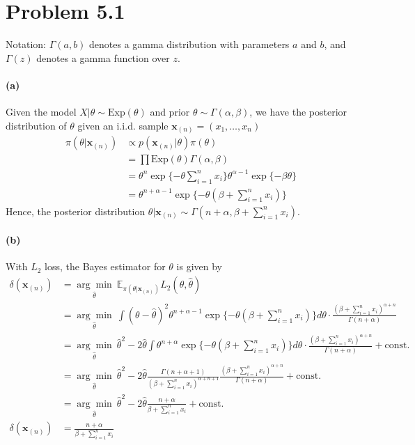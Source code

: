 \section{Problem 5.1}
Notation: $\Gamma(a, b)$ denotes a gamma distribution with parameters $a$ and $b$, and $\Gamma(z)$ denotes a gamma function over $z$.

\paragraph{(a)}
Given the model $X \vert \theta \sim \mathrm{Exp}(\theta)$ and prior $\theta \sim \Gamma(\alpha, \beta)$, we have the posterior distribution of $\theta$ given an i.i.d. sample $\bm{x}_{(n)} = (x_1, \dots, x_n)$
\begin{align*}
    \pi(\theta \vert \bm{x}_{(n)}) &\propto p(\bm{x}_{(n)} \vert \theta) \pi(\theta) \\
    &= \prod \mathrm{Exp}(\theta) \Gamma(\alpha, \beta)\\
    &= \theta^n \exp \{-\theta \sum_{i=1}^{n} x_i\} \theta^{\alpha-1} \exp \{ -\beta \theta\}\\
    &= \theta^{n+\alpha-1} \exp\{-\theta (\beta + \sum_{i=1}^{n} x_i)\}
\end{align*}
Hence, the posterior distribution $\theta \vert \bm{x}_{(n)} \sim \Gamma(n+\alpha, \beta + \sum_{i=1}^{n}x_i)$.

\paragraph{(b)}
With $L_2$ loss, the Bayes estimator for $\theta$ is given by
\begin{align*}
    \delta(\bm{x}_{(n)})
    &= \underset{\hat{\theta}}{\arg\min}\ \mathbb{E}_{\pi(\theta \vert \bm{x}_{(n)})} L_2(\theta, \hat{\theta})\\
    &= \underset{\hat{\theta}}{\arg\min}\ \int (\theta - \hat{\theta})^2 \theta^{n+\alpha-1} \exp\{-\theta (\beta + \sum_{i=1}^{n} x_i)\} d\theta \cdot \frac{(\beta+\sum_{i=1}^{n}x_i)^{\alpha+n}}{\Gamma(n+\alpha)}\\
    &= \underset{\hat{\theta}}{\arg\min}\ \hat{\theta}^2 - 2\hat{\theta} \int \theta^{n+\alpha} \exp\{-\theta (\beta + \sum_{i=1}^{n} x_i)\} d\theta \cdot \frac{(\beta+\sum_{i=1}^{n}x_i)^{\alpha+n}}{\Gamma(n+\alpha)} + \mathrm{const.}\\
    &= \underset{\hat{\theta}}{\arg\min}\ \hat{\theta}^2 - 2\hat{\theta} \frac{\Gamma(n+\alpha+1)}{(\beta+\sum_{i=1}^{n}x_i)^{\alpha+n+1}} \frac{(\beta+\sum_{i=1}^{n}x_i)^{\alpha+n}}{\Gamma(n+\alpha)} + \mathrm{const.}\\
    &= \underset{\hat{\theta}}{\arg\min}\ \hat{\theta}^2 - 2\hat{\theta} \frac{n+\alpha}{\beta + \sum_{i=1}^n x_i} + \mathrm{const.}\\
    \delta(\bm{x}_{(n)})
    &= \frac{n+\alpha}{\beta + \sum_{i=1}^n x_i}
\end{align*}

